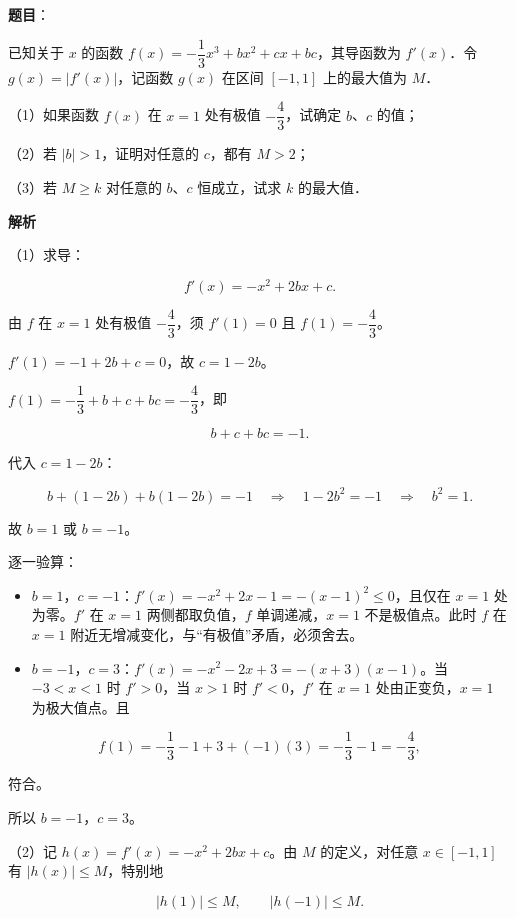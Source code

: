 \begin{answer}

\textbf{题目}：

已知关于 $x$ 的函数 $f(x)=-\dfrac13x^3+bx^2+cx+bc$，其导函数为 $f'(x)$．令 $g(x)=|f'(x)|$，记函数 $g(x)$ 在区间 $[-1,1]$ 上的最大值为 $M$．

（1）如果函数 $f(x)$ 在 $x=1$ 处有极值 $-\dfrac43$，试确定 $b$、$c$ 的值；

（2）若 $|b|>1$，证明对任意的 $c$，都有 $M>2$；

（3）若 $M\geqslant k$ 对任意的 $b$、$c$ 恒成立，试求 $k$ 的最大值．

\textbf{解析}

（1）求导：

\nopagebreak[4]
\[f'(x)=-x^2+2bx+c.\]

由 $f$ 在 $x=1$ 处有极值 $-\dfrac43$，须 $f'(1)=0$ 且 $f(1)=-\dfrac43$。

$f'(1)=-1+2b+c=0$，故 $c=1-2b$。

$f(1)=-\dfrac13+b+c+bc=-\dfrac43$，即

\nopagebreak[4]
\[b+c+bc=-1.\]

代入 $c=1-2b$：

\nopagebreak[4]
\[b+(1-2b)+b(1-2b)=-1\quad\Longrightarrow\quad1-2b^2=-1\quad\Longrightarrow\quad b^2=1.\]

故 $b=1$ 或 $b=-1$。

逐一验算：

\begin{itemize}
\item $b=1$，$c=-1$：$f'(x)=-x^2+2x-1=-(x-1)^2\leqslant0$，且仅在 $x=1$ 处为零。$f'$ 在 $x=1$ 两侧都取负值，$f$ 单调递减，$x=1$ 不是极值点。此时 $f$ 在 $x=1$ 附近无增减变化，与“有极值”矛盾，必须舍去。
\item $b=-1$，$c=3$：$f'(x)=-x^2-2x+3=-(x+3)(x-1)$。当 $-3<x<1$ 时 $f'>0$，当 $x>1$ 时 $f'<0$，$f'$ 在 $x=1$ 处由正变负，$x=1$ 为极大值点。且
\end{itemize}

\nopagebreak[4]
\[f(1)=-\frac13-1+3+(-1)(3)=-\frac13-1=-\frac43,\]

符合。

所以 $b=-1$，$c=3$。

（2）记 $h(x)=f'(x)=-x^2+2bx+c$。由 $M$ 的定义，对任意 $x\in[-1,1]$ 有 $|h(x)|\leqslant M$，特别地

\nopagebreak[4]
\[|h(1)|\leqslant M,\qquad |h(-1)|\leqslant M.\]


\end{answer}

